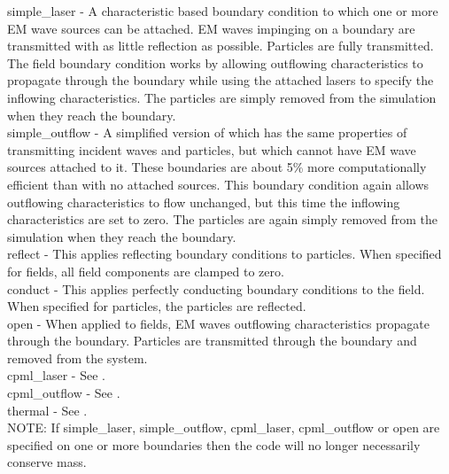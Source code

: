 {\emphtext simple\_laser} - A characteristic based boundary condition to which
one or more EM wave sources can be attached. EM waves impinging on a
 boundary are transmitted with as little reflection
as possible. Particles are fully transmitted. The field boundary condition
works by allowing outflowing characteristics to propagate through the boundary
while using the attached lasers to specify the inflowing characteristics. The
particles are simply removed from the simulation when they reach the
boundary.\\

{\emphtext simple\_outflow} - A simplified version of 
which has the same properties of transmitting incident waves and
particles, but which cannot have EM wave sources attached to it. These
boundaries are about 5\% more computationally efficient than
 with no attached sources. This boundary
condition again allows outflowing characteristics to flow unchanged, but this
time the inflowing characteristics are set to zero. The particles are again
simply removed from the simulation when they reach the boundary.\\

{\emphtext reflect} - This applies reflecting boundary conditions to
  particles. When specified for fields, all field components are clamped
  to zero.\\

{\emphtext conduct} - This applies perfectly conducting boundary conditions
  to the field. When specified for particles, the particles are reflected.\\

{\emphtext open} - When applied to fields, EM waves outflowing characteristics
propagate through the boundary. Particles are transmitted through the boundary
and removed from the system.\\

{\emphtext cpml\_laser} - See .\\

{\emphtext cpml\_outflow} - See .\\

{\emphtext thermal} - See .\\

{\emphtext NOTE: If simple\_laser, simple\_outflow, cpml\_laser,
cpml\_outflow or open are specified on one or more boundaries then the code
will no longer necessarily conserve mass.}\\

